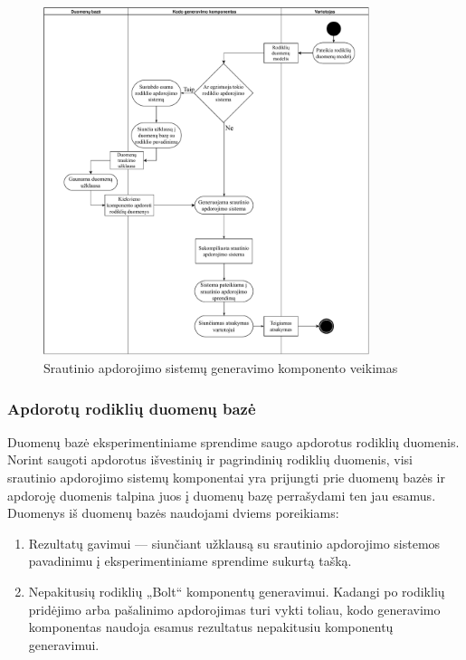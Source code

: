 \documentclass{VUMIFPSbakalaurinis}
\begin{document}
\begin{figure}[H]
    \centering
    \includegraphics[width=0.85\textwidth]{img/generation-flow.pdf}
    \caption{Srautinio apdorojimo sistemų generavimo komponento veikimas}
    \label{img:generation-flow}
\end{figure}

\subsubsection{Apdorotų rodiklių duomenų bazė}

Duomenų bazė eksperimentiniame sprendime saugo apdorotus rodiklių duomenis. Norint saugoti apdorotus išvestinių ir pagrindinių rodiklių duomenis, visi srautinio apdorojimo sistemų komponentai yra prijungti prie duomenų bazės ir apdoroję duomenis talpina juos į duomenų bazę perrašydami ten jau esamus. Duomenys iš duomenų bazės naudojami dviems poreikiams: 
\begin{enumerate}
    \item Rezultatų gavimui — siunčiant užklausą su srautinio apdorojimo sistemos pavadinimu į eksperimentiniame sprendime sukurtą tašką. 
    \item Nepakitusių rodiklių „Bolt“ komponentų generavimui. Kadangi po rodiklių pridėjimo arba pašalinimo apdorojimas turi vykti toliau, kodo generavimo komponentas naudoja esamus rezultatus nepakitusiu komponentų generavimui.   
\end{enumerate}  
\end{document}
